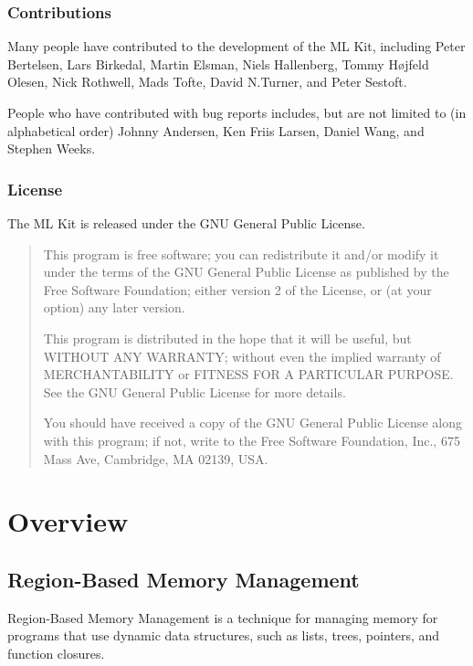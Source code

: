 \documentclass[12pt]{book}
\begin{document}
\newpage

\section*{Contributions}
Many people have contributed to the development of the ML Kit,
including Peter Bertelsen, Lars Birkedal, Martin Elsman, Niels
Hallenberg, Tommy H\o jfeld Olesen, Nick Rothwell, Mads Tofte, David
N.\@ Turner, and Peter Sestoft.

People who have contributed with bug reports includes, but are not
limited to (in alphabetical order) Johnny Andersen, Ken Friis Larsen,
Daniel Wang, and Stephen Weeks.

\section*{License}
The ML Kit is released under the GNU General Public License.  

{\sc
\begin{quote}
  This program is free software; you can redistribute it and/or
  modify it under the terms of the GNU General Public License as
  published by the Free Software Foundation; either version 2 of the
  License, or (at your option) any later version.
  
  This program is distributed in the hope that it will be useful, but
  WITHOUT ANY WARRANTY; without even the implied warranty of
  MERCHANTABILITY or FITNESS FOR A PARTICULAR PURPOSE.  See the GNU
  General Public License for more details.
  
  You should have received a copy of the GNU General Public License
  along with this program; if not, write to the Free Software
  Foundation, Inc., 675 Mass Ave, Cambridge, MA 02139, USA.
\end{quote}
}

\part{Overview}

\chapter{Region-Based Memory Management}
\label{intro.sec}
Region-Based Memory Management is a technique for managing
memory for programs that use dynamic data structures, such as lists,
trees, pointers, and function closures.
\end{document}
